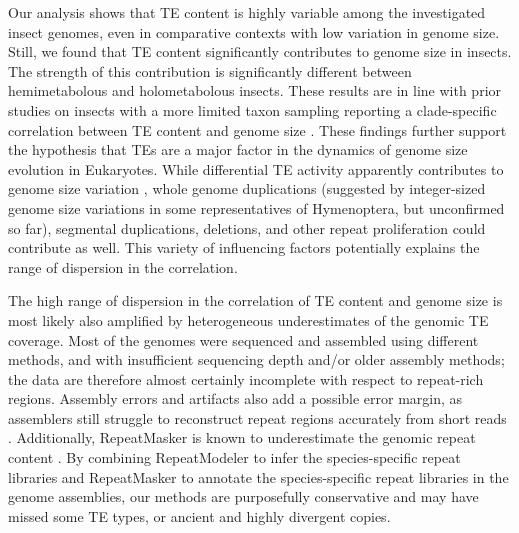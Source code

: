 Our analysis shows that TE content is highly variable among the
investigated insect genomes, even in comparative contexts with low
variation in genome size. Still, we found that TE content significantly
contributes to genome size in insects. The strength of this contribution
is significantly different between hemimetabolous and holometabolous
insects. These results are in line with prior studies on insects with a
more limited taxon sampling reporting a clade-specific correlation
between TE content and genome size
\citep{Vieira1999,Vieira2002,Kidwell2000,Honeybee2006,Bosco2007,Sessegolo2016}.
These findings further support the hypothesis that TEs are a major
factor in the dynamics of genome size evolution in Eukaryotes. While
differential TE activity apparently contributes to genome size variation
\citep{Petrov2001,Kidwell2002,Agren2011}, whole genome duplications
(suggested by integer-sized genome size variations in some
representatives of Hymenoptera, but unconfirmed so far), segmental
duplications, deletions, and other repeat proliferation
\citep{Parfrey2008} could contribute as well. This variety of
influencing factors potentially explains the range of dispersion in the
correlation.

The high range of dispersion in the correlation of TE content and genome
size is most likely also amplified by heterogeneous underestimates of
the genomic TE coverage. Most of the genomes were sequenced and
assembled using different methods, and with insufficient sequencing
depth and/or older assembly methods; the data are therefore almost
certainly incomplete with respect to repeat-rich regions. Assembly
errors and artifacts also add a possible error margin, as assemblers
still struggle to reconstruct repeat regions accurately from short reads
\citep{Schatz2010}. Additionally, RepeatMasker is known to underestimate
the genomic repeat content \citep{deKoning2011}. By combining
RepeatModeler to infer the species-specific repeat libraries and
RepeatMasker to annotate the species-specific repeat libraries in the
genome assemblies, our methods are purposefully conservative and may
have missed some TE types, or ancient and highly divergent copies.

